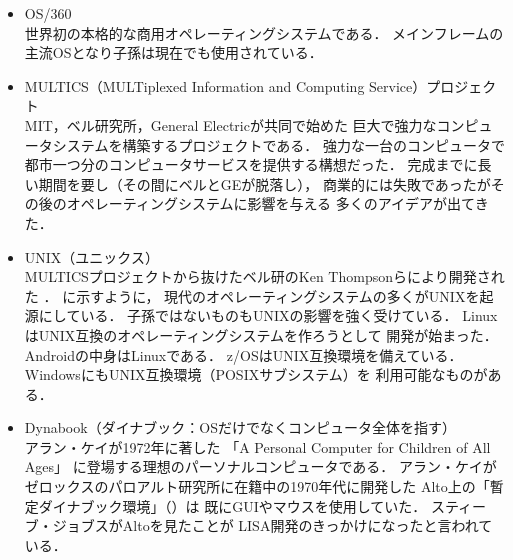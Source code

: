 \begin{itemize}
\item OS/360 \\
  世界初の本格的な商用オペレーティングシステムである．
  メインフレームの主流OSとなり子孫は現在でも使用されている\cite{os360}．

\item MULTICS（MULTiplexed Information and Computing Service）プロジェクト
  \cite{third} \\
  MIT，ベル研究所，General Electricが共同で始めた
  巨大で強力なコンピュータシステムを構築するプロジェクトである．
  強力な一台のコンピュータで
  都市一つ分のコンピュータサービスを提供する構想だった．
  完成までに長い期間を要し（その間にベルとGEが脱落し），
  商業的には失敗であったがその後のオペレーティングシステムに影響を与える
  多くのアイデアが出てきた．

\item UNIX（ユニックス） \\
  MULTICSプロジェクトから抜けたベル研のKen Thompsonらにより開発された
  \cite{unix}．
  に示すように，
  現代のオペレーティングシステムの多くがUNIXを起源にしている．
  子孫ではないものもUNIXの影響を強く受けている．
  LinuxはUNIX互換のオペレーティングシステムを作ろうとして
  開発が始まった\cite{linux}．
  Androidの中身はLinuxである\cite{android}．
  z/OSはUNIX互換環境を備えている\cite{zos}．
  WindowsにもUNIX互換環境（POSIXサブシステム）を
  利用可能なものがある\cite{windows}．

\item Dynabook（ダイナブック：OSだけでなくコンピュータ全体を指す）
  \cite{dynabook2} \\
  アラン・ケイが1972年に著した
  「A Personal Computer for Children of All Ages」\cite{key72, key72J}
  に登場する理想のパーソナルコンピュータである．
  アラン・ケイがゼロックスのパロアルト研究所に在籍中の1970年代に開発した
  Alto上の「暫定ダイナブック環境」（）は
  既にGUIやマウスを使用していた．
  スティーブ・ジョブスがAltoを見たことが
  LISA開発のきっかけになったと言われている\cite{dynabook}．


\end{itemize}
